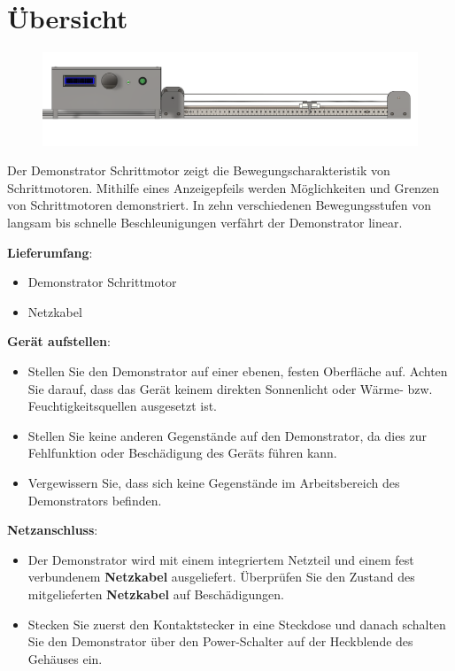 %
%
%



\chapter{Übersicht}

\begin{figure}[htb]
	\begin{center}
		
			\includegraphics[width=\textwidth]{Images/Konstruktion1.png}
	\end{center}
\end{figure}


Der Demonstrator Schrittmotor zeigt die Bewegungscharakteristik von Schrittmotoren. Mithilfe eines Anzeigepfeils werden Möglichkeiten und Grenzen von Schrittmotoren demonstriert. In zehn verschiedenen Bewegungsstufen von langsam bis schnelle Beschleunigungen verfährt der Demonstrator linear. 

\newpage
\textbf{Lieferumfang}: 
\begin{itemize}
\item Demonstrator Schrittmotor	
\item Netzkabel
	\end{itemize} 	
	\bigskip
	\textbf{Gerät aufstellen}: 
	\begin{itemize}
	\item Stellen Sie den Demonstrator auf einer ebenen, festen Oberfläche auf. Achten Sie darauf, dass das Gerät keinem direkten Sonnenlicht oder Wärme- bzw. Feuchtigkeitsquellen ausgesetzt ist. 
	\item Stellen Sie keine anderen Gegenstände auf den Demonstrator, da dies zur Fehlfunktion oder Beschädigung des Geräts führen kann. 
	\item Vergewissern Sie, dass sich keine Gegenstände im Arbeitsbereich des Demonstrators befinden.
	\end{itemize}
	\textbf{Netzanschluss}:
	\begin{itemize}
		\item Der Demonstrator wird mit einem integriertem Netzteil und einem fest verbundenem \textbf{Netzkabel} ausgeliefert. Überprüfen Sie den Zustand des mitgelieferten \textbf{Netzkabel} auf Beschädigungen.
		\item Stecken Sie zuerst den Kontaktstecker in eine Steckdose und danach schalten Sie den Demonstrator über den Power-Schalter auf der Heckblende des Gehäuses ein. 
	\end{itemize} 



